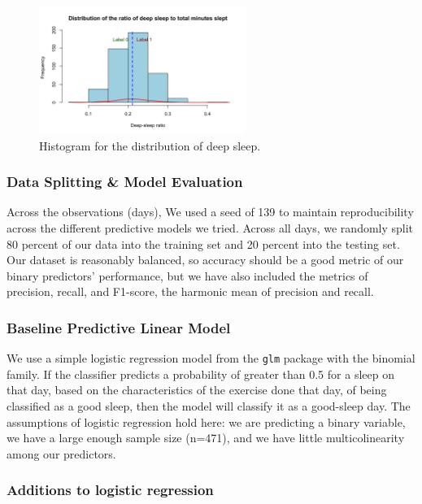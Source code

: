 \documentclass{article}
\begin{document}
\begin{figure}[h!]
  \centering
  \includegraphics[width=0.6\textwidth]{images/000020.png}
  \caption{Histogram for the distribution of deep sleep.}
  \label{fig:correlation-matrix-cleaned}
\end{figure}

\subsubsection{\hspace{0.5em} Data Splitting \& Model Evaluation}
Across the observations (days), We used a seed of 139 to maintain reproducibility across the different predictive models we tried. Across all days, we randomly split 80 percent of our data into the training set and 20 percent into the testing set. Our dataset is reasonably balanced, so accuracy should be a good metric of our binary predictors' performance, but we have also included the metrics of precision, recall, and F1-score, the harmonic mean of precision and recall.
\subsubsection{ \hspace{0.5em} Baseline Predictive Linear Model}

We use a simple logistic regression model from the \texttt{glm} package with the binomial family. If the classifier predicts a probability of greater than 0.5 for a sleep on that day, based on the characteristics of the exercise done that day, of being classified as a good sleep, then the model will classify it as a good-sleep day. The assumptions of logistic regression hold here: we are predicting a binary variable, we have a large enough sample size (n=471), and we have little multicolinearity among our predictors.





\subsubsection{\hspace{0.5em} Additions to logistic regression}
\end{document}
